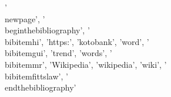 {'\\newpage', '\\begin{thebibliography}', '\\bibitem{hi}', 'https:', 'kotobank', 'word', '\\bibitem{gui}', 'trend', 'words', '\\bibitem{mr}', 'Wikipedia', 'wikipedia', 'wiki', '\\bibitem{fittslaw}', '\\end{thebibliography}'}
